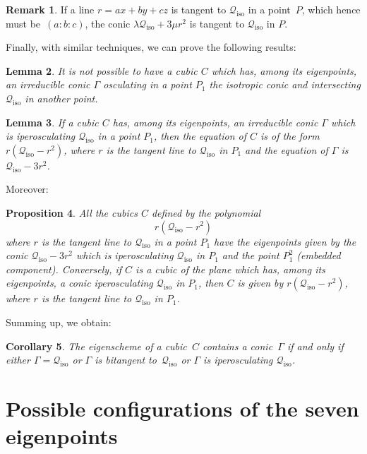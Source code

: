 \documentclass[a4paper, 11pt, reqno]{amsart}
\theoremstyle{plain}
\newtheorem{lemma}{Lemma}[section]
\newtheorem{prop}[lemma]{Proposition}
\newtheorem{corollary}[lemma]{Corollary}
\theoremstyle{definition}
\newtheorem{rmk}[lemma]{Remark}
\newcommand{\iso}{\mathcal{Q}_{\mathrm{iso}}}
\begin{document}
\begin{rmk}
If a line $r=ax+by+cz$ is tangent to $\iso$ in a point~$P$, which hence must be~$(a:b:c)$, 
the conic $\lambda \iso +3 \mu r^2$ is tangent to $\iso$ in $P$.
\end{rmk}
Finally, with similar techniques, we can prove the following results:
\begin{lemma}
    It is not possible to have a cubic $C$ which has, among its eigenpoints, an irreducible conic $\Gamma$ osculating in a point $P_1$ the isotropic conic and intersecting $\iso$ in another point.
\end{lemma}
\begin{lemma}
    If a cubic $C$ has, among its eigenpoints, an irreducible conic $\Gamma$ which is iperosculating $\iso$ in a point $P_1$, then the equation of $C$ is of the form 
    $r(\iso - r^2)$, where $r$ is the tangent line to $\iso$ in $P_1$ and the equation of $\Gamma$ is $\iso-3r^2$.
\end{lemma}
Moreover:
\begin{prop}
    All the cubics $C$ defined by the polynomial
\begin{equation}
\label{cub_osc}
  r(\iso -r^2)
\end{equation}
where $r$ is the tangent line to $\iso$ in a point $P_1$ have the eigenpoints given by the conic $\iso-3r^2$ which is iperosculating $\iso$ in $P_1$ and the point $P_1^2$ (embedded component). Conversely, if $C$ is a cubic of the plane which has, among its eigenpoints, a conic iperosculating $\iso$ in $P_1$, then $C$ is given by $r(\iso-r^2)$, where $r$ is the tangent line to $\iso$ in $P_1$.
%
\end{prop}

Summing up, we obtain:

\begin{corollary}
      The eigenscheme of a cubic~$C$ contains a conic~$\Gamma$ if and only if either $\Gamma = \iso$ or $\Gamma$ is bitangent to~$\iso$ or $\Gamma$ is iperosculating $\iso$.
\end{corollary}


\section{Possible configurations of the seven eigenpoints}
\label{further_alignments}
\end{document}
